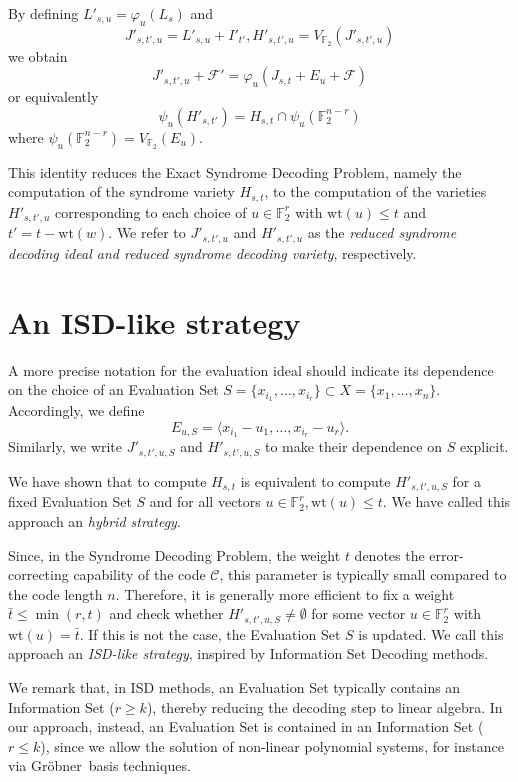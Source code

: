 \documentclass{amsart}
\def\FF{{\mathbb F}}
\def\Gr{Gr\"obner}
\def\wt{{\mathrm{wt}}}
\def\cF{{\mathcal{F}}}
\def\cC{{\mathcal{C}}}
\def\bt{{\bar{t}}}
\begin{document}
By defining $L'_{s,u} = \varphi_u(L_s)$ and
\[
J'_{s,t',u} = L'_{s,u} + I'_{t'}, H'_{s,t',u} = V_{\FF_2}(J'_{s,t',u})
\]
we obtain
\[
J'_{s,t',u} + \cF' = \varphi_u(J_{s,t} + E_u + \cF)
\]
or equivalently
\[
\psi_u(H'_{s,t'}) = H_{s,t} \cap \psi_u(\FF_2^{n-r})
\]
where $\psi_u(\FF_2^{n-r}) = V_{\FF_2}(E_u)$.

This identity reduces the Exact Syndrome Decoding Problem, namely the computation of the
syndrome variety $H_{s,t}$, to the computation of the varieties $H'_{s,t',u}$ corresponding
to each choice of $u \in \FF_2^r$ with $\wt(u)\leq t$ and $t' = t - \wt(w)$.
We refer to $J'_{s,t',u}$ and $H'_{s,t',u}$ as the {\em reduced syndrome decoding ideal
and reduced syndrome decoding variety}, respectively.


\section{An ISD-like strategy}

A more precise notation for the evaluation ideal should indicate its dependence
on the choice of an Evaluation Set $S = \{x_{i_1},\ldots,x_{i_r}\}\subset
X = \{x_1,\ldots,x_n\}$. Accordingly, we define
\[
E_{u,S} = \langle x_{i_1} - u_1,\ldots,x_{i_r} - u_r\rangle.
\]
Similarly, we write $J'_{s,t',u,S}$ and $H'_{s,t',u,S}$ to make their dependence
on $S$ explicit.

We have shown that to compute $H_{s,t}$ is equivalent to compute $H'_{s,t',u,S}$
for a fixed Evaluation Set $S$ and for all vectors $u\in\FF_2^r, \wt(u)\leq t$.
We have called this approach an {\em hybrid strategy}.

Since, in the Syndrome Decoding Problem, the weight $t$ denotes the error-correcting
capability of the code $\cC$, this parameter is typically small compared to the code
length $n$. Therefore, it is generally more efficient to fix a weight $\bt \leq \min(r,t)$
and check whether $H'_{s,t',u,S}\neq \emptyset$ for some vector $u\in\FF_2^r$ with
$\wt(u) = \bt$. If this is not the case, the Evaluation Set $S$ is updated. We call
this approach an {\em ISD-like strategy}, inspired by Information Set Decoding methods.

We remark that, in ISD methods, an Evaluation Set typically contains an Information Set
($r\geq k$), thereby reducing the decoding step to linear algebra. In our approach,
instead, an Evaluation Set is contained in an Information Set ($r\leq k$), since
we allow the solution of non-linear polynomial systems, for instance via \Gr\ basis
techniques.
\end{document}
